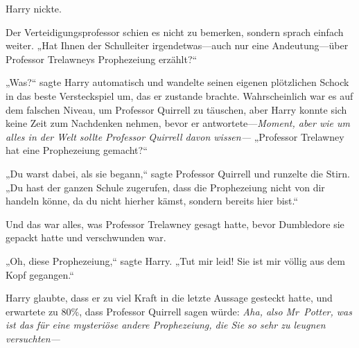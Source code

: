 Harry nickte.

Der Verteidigungsprofessor schien es nicht zu bemerken, sondern sprach einfach weiter. „Hat Ihnen der Schulleiter irgendetwas—auch nur eine Andeutung—über Professor Trelawneys Prophezeiung erzählt?“

„Was?“ sagte Harry automatisch und wandelte seinen eigenen plötzlichen Schock in das beste Versteckspiel um, das er zustande brachte.
Wahrscheinlich war es auf dem falschen Niveau, um Professor Quirrell zu täuschen, aber Harry konnte sich keine Zeit zum Nachdenken nehmen, bevor er antwortete—\emph{Moment, aber wie um alles in der Welt sollte Professor Quirrell davon wissen—} „Professor Trelawney hat eine Prophezeiung gemacht?“

„Du warst dabei, als sie begann,“ sagte Professor Quirrell und runzelte die Stirn. „Du hast der ganzen Schule zugerufen, dass die Prophezeiung nicht von dir handeln könne, da du nicht hierher kämst, sondern bereits hier bist.“


Und das war alles, was Professor Trelawney gesagt hatte, bevor Dumbledore sie gepackt hatte und verschwunden war.

„Oh, diese Prophezeiung,“ sagte Harry. „Tut mir leid! Sie ist mir völlig aus dem Kopf gegangen.“

Harry glaubte, dass er zu viel Kraft in die letzte Aussage gesteckt hatte, und erwartete zu 80\%, dass Professor Quirrell sagen würde: \emph{Aha, also Mr~Potter, was ist das für eine mysteriöse \emph{andere} Prophezeiung, die Sie so sehr zu leugnen versuchten—}

